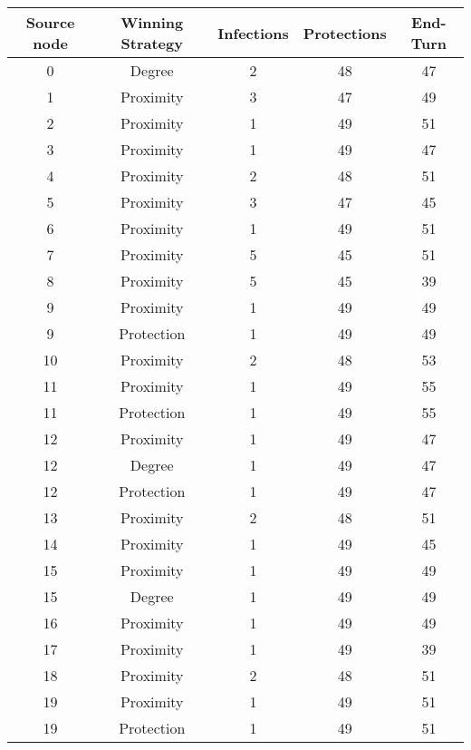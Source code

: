 \documentclass[results.tex]{subfiles}
\begin{document}
\begin{center}
  \begin{tabular}{| c || c | c | c | c |}
    \hline
    {\bfseries Source node} & {\bfseries Winning Strategy} & {\bfseries Infections} & {\bfseries Protections} & {\bfseries End-Turn} \\  %
    \hline\hline
    0 & Degree & 2 & 48 & 47 \\ 
    \hline
    1 & Proximity & 3 & 47 & 49 \\ 
    \hline
    2 & Proximity & 1 & 49 & 51 \\ 
    \hline
    3 & Proximity & 1 & 49 & 47 \\ 
    \hline
    4 & Proximity & 2 & 48 & 51 \\ 
    \hline
    5 & Proximity & 3 & 47 & 45 \\ 
    \hline
    6 & Proximity & 1 & 49 & 51 \\ 
    \hline
    7 & Proximity & 5 & 45 & 51 \\ 
    \hline
    8 & Proximity & 5 & 45 & 39 \\ 
    \hline
    9 & Proximity & 1 & 49 & 49 \\ 
    \hline
    9 & Protection & 1 & 49 & 49 \\ 
    \hline
    10 & Proximity & 2 & 48 & 53 \\ 
    \hline
    11 & Proximity & 1 & 49 & 55 \\ 
    \hline
    11 & Protection & 1 & 49 & 55 \\ 
    \hline
    12 & Proximity & 1 & 49 & 47 \\ 
    \hline
    12 & Degree & 1 & 49 & 47 \\ 
    \hline
    12 & Protection & 1 & 49 & 47 \\ 
    \hline
    13 & Proximity & 2 & 48 & 51 \\ 
    \hline
    14 & Proximity & 1 & 49 & 45 \\ 
    \hline
    15 & Proximity & 1 & 49 & 49 \\ 
    \hline
    15 & Degree & 1 & 49 & 49 \\ 
    \hline
    16 & Proximity & 1 & 49 & 49 \\ 
    \hline
    17 & Proximity & 1 & 49 & 39 \\ 
    \hline
    18 & Proximity & 2 & 48 & 51 \\ 
    \hline
    19 & Proximity & 1 & 49 & 51 \\ 
    \hline
    19 & Protection & 1 & 49 & 51 \\ 

\end{tabular}
\end{center}
\end{document}
